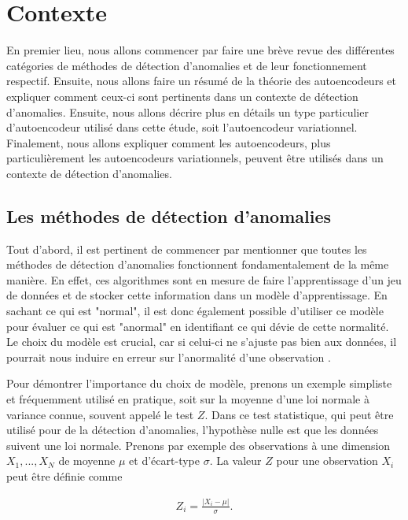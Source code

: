 \chapter{Contexte}     %
\label{chap:background}                   %

En premier lieu, nous allons commencer par faire une brève revue des différentes catégories  de méthodes de détection d'anomalies et de leur fonctionnement respectif. Ensuite, nous allons faire un résumé de la théorie des autoencodeurs et expliquer comment ceux-ci sont pertinents dans un contexte de détection d'anomalies. Ensuite, nous allons décrire plus en détails un type particulier d'autoencodeur utilisé dans cette étude, soit l'autoencodeur variationnel. Finalement, nous allons expliquer comment les autoencodeurs, plus particulièrement les autoencodeurs variationnels, peuvent être utilisés dans un contexte de détection d'anomalies.

\section{Les méthodes de détection d'anomalies}

Tout d'abord, il est pertinent de commencer par mentionner que toutes les méthodes de détection d'anomalies fonctionnent fondamentalement de la même manière. En effet, ces algorithmes sont en mesure de faire l'apprentissage d'un jeu de données et de stocker cette information dans un modèle d'apprentissage. En sachant ce qui est "normal", il est donc également possible d'utiliser ce modèle pour évaluer ce qui est "anormal" en identifiant ce qui dévie de cette normalité. Le choix du modèle est crucial, car si celui-ci ne s'ajuste pas bien aux données, il pourrait nous induire en erreur sur l'anormalité d'une observation \citep{10.5555/3086742}. 

Pour démontrer l'importance du choix de modèle, prenons un exemple simpliste et fréquemment utilisé en pratique, soit sur la moyenne d'une loi normale à variance connue, souvent appelé le test $Z$. Dans ce test statistique, qui peut être utilisé pour de la détection d'anomalies, l'hypothèse nulle est que les données suivent une loi normale. Prenons par exemple des observations à une dimension $X_1, ..., X_N$ de moyenne $\mu$ et d'écart-type $\sigma$. La valeur $Z$ pour une observation $X_i$ peut être définie comme

\begin{gather}
Z_i = \frac{|X_i-\mu|}{\sigma}.
\end{gather}

